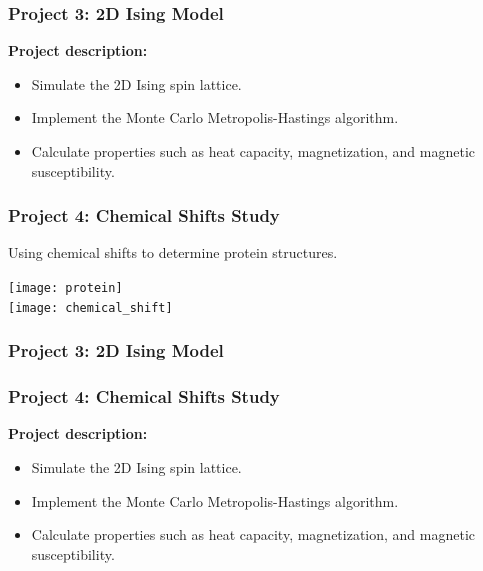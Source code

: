 \documentclass{beamer}
\begin{document}
{\begin{columns}[c]
    \end{columns}

}


\frame
{
    \frametitle{Project 3: 2D Ising Model}

    \textbf{Project description:}

    \bigskip

    \begin{itemize}

        \item Simulate the 2D Ising spin lattice.

        \bigskip

        \item Implement the Monte Carlo Metropolis-Hastings algorithm.

        \bigskip

        \item Calculate properties such as heat capacity, magnetization, and magnetic susceptibility.

    \end{itemize}

}

\frame
{
    \frametitle{Project 4: Chemical Shifts Study}

    \begin{center}
        Using chemical shifts to determine protein structures.
    \end{center}

    \bigskip

%

            \centering
        
            \texttt{[image: protein]}\\
            \texttt{[image: chemical\_shift]}


%
%


}


\frame
{
    \frametitle{Project 3: 2D Ising Model}
    \frametitle{Project 4: Chemical Shifts Study}

    \textbf{Project description:}

    \bigskip

    \begin{itemize}

        \item Simulate the 2D Ising spin lattice.

        \bigskip

        \item Implement the Monte Carlo Metropolis-Hastings algorithm.

        \bigskip

        \item Calculate properties such as heat capacity, magnetization, and magnetic susceptibility.

    \end{itemize}

}
\end{document}
